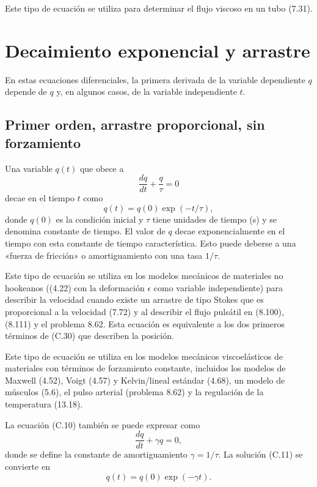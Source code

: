 \documentclass[12pt,a4paper]{book}
\begin{document}
Este tipo de ecuación se utiliza para determinar el flujo viscoso en un tubo (7.31).

\section{Decaimiento exponencial y arrastre}\label{sec:C.2}

En estas ecuaciones diferenciales, la primera derivada de la variable dependiente $q$ depende de $q$ y, en algunos casos, de la variable independiente $t$.

\subsection*{Primer orden, arrastre proporcional, sin forzamiento}

Una variable $q(t)$ que obece a
\begin{equation}
\frac{dq}{dt} + \frac{q}{\tau} = 0
\label{eq:C.10}
\end{equation}
decae en el tiempo $t$ como
\begin{equation}
q(t) = q(0) \exp(-t/\tau),
\label{eq:C.11}
\end{equation}
donde $q(0)$ es la condición inicial y $\tau$ tiene unidades de tiempo (s) y se denomina constante de tiempo. El valor de $q$ decae exponencialmente en el tiempo con esta constante de tiempo característica. Esto puede deberse a una «fuerza de fricción» o amortiguamiento con una tasa $1/\tau$.

Este tipo de ecuación se utiliza en los modelos mecánicos de materiales no hookeanos ((4.22) con la deformación $\epsilon$ como variable independiente) para describir la velocidad cuando existe un arrastre de tipo Stokes que es proporcional a la velocidad (7.72) y al describir el flujo pulsátil en (8.100), (8.111) y el problema 8.62. Esta ecuación es equivalente a los dos primeros términos de (C.30) que describen la posición.

Este tipo de ecuación se utiliza en los modelos mecánicos viscoelásticos de materiales con términos de forzamiento constante, incluidos los modelos de Maxwell (4.52), Voigt (4.57) y Kelvin/lineal estándar (4.68), un modelo de músculos (5.6), el pulso arterial (problema 8.62) y la regulación de la temperatura (13.18).

La ecuación (C.10) también se puede expresar como
\begin{equation}
\frac{dq}{dt} + \gamma q = 0,
\label{eq:C.12}
\end{equation}
donde se define la constante de amortiguamiento $\gamma = 1/\tau$. La solución (C.11) se convierte en
\begin{equation}
q(t) = q(0) \exp(-\gamma t).
\label{eq:C.13}
\end{equation}
\end{document}
